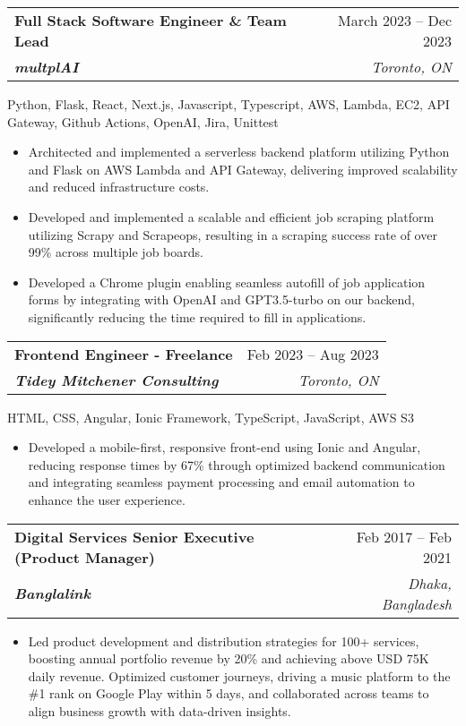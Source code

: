 \documentclass[letterpaper,11pt]{article}
\makeatletter
\newcommand{\resumeItem}[1]{
  \item\small{
    {#1 \vspace{-2pt}}
  }
}
\newcommand{\resumeSubheading}[4]{
  \vspace{-2pt}\item
    \begin{tabular*}{0.97\textwidth}[t]{l@{\extracolsep{\fill}}r}
      \textbf{#1} & #2 \\
      \textit{\small#3} & \textit{\small #4} \\
    \end{tabular*}\vspace{-7pt}
}
\newcommand{\resumeItemListStart}{\begin{itemize}[leftmargin=0.16in]}
\newcommand{\resumeItemListEnd}{\end{itemize}\vspace{-5pt}}
\makeatother
\begin{document}
    \resumeSubheading
      {Full Stack Software Engineer \& Team Lead}{March 2023 -- Dec 2023}
      {\textbf{multplAI}} {Toronto, ON}
    \begin{itemize}[leftmargin=0pt, label={}]
        \footnotesize{\item{
         {Python, Flask, React, Next.js, Javascript, Typescript, AWS, Lambda, EC2, API Gateway, Github Actions, OpenAI, Jira,  Unittest} \\
        }}
    \end{itemize}
      \resumeItemListStart
        \resumeItem{Architected and implemented a serverless backend platform utilizing Python and Flask on AWS Lambda and API Gateway, delivering improved scalability and reduced infrastructure costs.}
        \resumeItem{Developed and implemented a scalable and efficient job scraping platform utilizing Scrapy and Scrapeops, resulting in a scraping success rate of over 99\% across multiple job boards.}
        \resumeItem{Developed a Chrome plugin enabling seamless autofill of job application forms by integrating with OpenAI and GPT3.5-turbo on our backend, significantly reducing the time required to fill in applications.}
      \resumeItemListEnd

     \vspace{4pt}
    \resumeSubheading
      {Frontend Engineer - Freelance}{Feb 2023 -- Aug 2023}
      {\textbf{Tidey Mitchener Consulting}}{Toronto, ON}
    \begin{itemize}[leftmargin=0pt, label={}]
        \footnotesize{\item{
         {HTML, CSS, Angular, Ionic Framework, TypeScript, JavaScript, AWS S3} \\
        }}
    \end{itemize}
      \resumeItemListStart
        \resumeItem{Developed a mobile-first, responsive front-end using Ionic and Angular, reducing response times by 67\% through optimized backend communication and integrating seamless payment processing and email automation to enhance the user experience.}
      \resumeItemListEnd

     \vspace{4pt}
    \resumeSubheading
      {Digital Services Senior Executive (Product Manager)}{Feb 2017 – Feb 2021}
      {\textbf{Banglalink}}{Dhaka, Bangladesh}
       \vspace{4pt}
      \resumeItemListStart
        \resumeItem{Led product development and distribution strategies for 100+ services, boosting annual portfolio revenue by 20\% and achieving above USD 75K daily revenue. Optimized customer journeys, driving a music platform to the \#1 rank on Google Play within 5 days, and collaborated across teams to align business growth with data-driven insights.}
    \resumeItemListEnd
\end{document}
